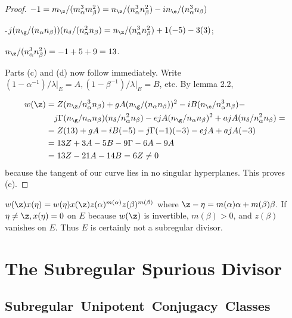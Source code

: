 \documentclass{memo-l}
\theoremstyle{definition}
\theoremstyle{remark}
\numberwithin{section}{chapter}
\numberwithin{equation}{chapter}
\begin{document}
\begin{proof}
\noindent
$-1 =   m_{{\z}}/(m_{\alpha}^{3}m_{\beta}^{2}) = 
n_{{\z}}/(n_{\alpha}^{3}n_{\beta}^{2}) - 
in_{{\e}}/(n_{\alpha}^{3}n_{\beta})$

-$j(n_{{\g}}/(n_{\alpha}n_{\beta}))
(n_{{\delta}}/(n_{\alpha}^{2}n_{\beta}) = 
n_{{\z}}/(n_{\alpha}^{3}n_{\beta}^{2}) + 1(-5) -3(3)$; 

$n_{{\z}}/(n_{\alpha}^{3}n_{\beta}^{2}) = -1+5+9 = 13$.

\medskip

\noindent
Parts (c) and (d) now follow immediately. 
 Write $(1-{\alpha}^{-1})/{\lambda} \vert_{E} = A, 
(1-{\beta}^{-1})/{\lambda} \vert_{E} = B$, etc. 
 By lemma 2.2,

\medskip

$$
\aligned
w({\z}) &=  Z(n_{{\z}}/n_{\alpha}^{3}n_{\beta}) + 
gA(n_{{\g}}/(n_{\alpha}n_{\beta}))^{2} - 
iB(n_{{\e}}/n_{\alpha}^{3}n_{\beta}) - \\      
&\quad j{\Gamma}(n_{{\g}}/n_{\alpha}n_{\beta})(n_{{\delta}}/n_{\alpha}^{2}
n_{\beta}) - ejA(n_{{\g}}/n_{\alpha}n_{\beta})^{2} + 
ajA(n_{{\delta}}/n_{\alpha}^{2}n_{\beta}) = \\
&= Z(13) + gA -iB(-5) -j{\Gamma}(-1)(-3) -ejA +ajA(-3) \\
&= 13Z + 3A -5B -9{\Gamma} -6A -9A \\
&= 13Z -21A -14B = 6Z \ne 0
\endaligned
$$ 
because the tangent of our curve lies in no singular hyperplanes. 
This proves (e).
\end{proof} 

\medpagebreak

\noindent
$w({\z})x({\eta}) = w({\eta})x({\z})z({\alpha})^{m({\alpha})}
z({\beta})^{m({\beta})}$ where ${\z}-{\eta} = 
m({\alpha}){\alpha}+m({\beta}){\beta}$. 
 If ${\eta}\ne {\z}, x({\eta}) = 0$ on $E$ because $w({\z})$ is 
invertible, $m({\beta}) > 0$, and $z({\beta})$ vanishes on $E$. 
 Thus $E$ is certainly not a subregular divisor.




\chapter{The Subregular Spurious Divisor}




\section{Subregular\ Unipotent\ Conjugacy\ Classes}
\end{document}
